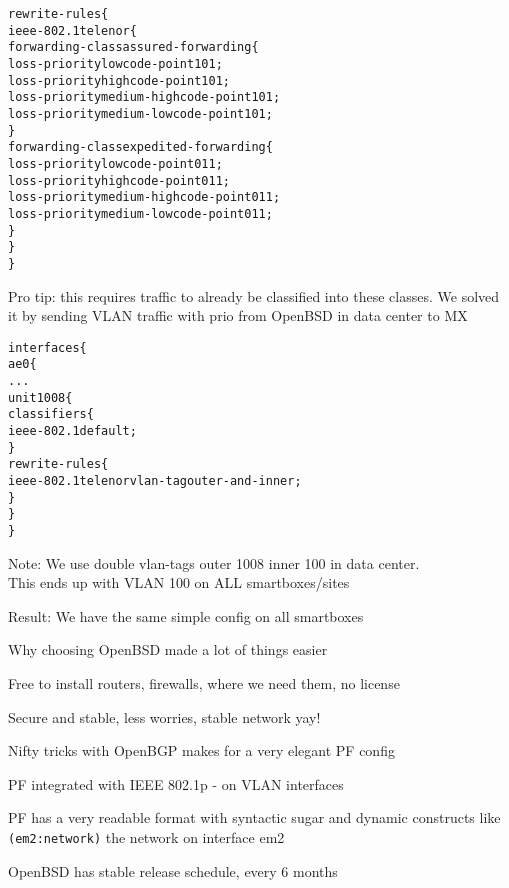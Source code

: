 \documentclass[18pt,landscape,a4paper,footrule]{foils}
\begin{document}
\begin{alltt}\small
rewrite-rules \{
    ieee-802.1 telenor \{
        forwarding-class assured-forwarding \{
            loss-priority low code-point 101;
            loss-priority high code-point 101;
            loss-priority medium-high code-point 101;
            loss-priority medium-low code-point 101;
        \}
        forwarding-class expedited-forwarding \{
            loss-priority low code-point 011;
            loss-priority high code-point 011;
            loss-priority medium-high code-point 011;
            loss-priority medium-low code-point 011;
        \}
    \}
\}
\end{alltt}

Pro tip: this requires traffic to already be classified into these classes.
We solved it by sending VLAN traffic with prio from OpenBSD in data center to MX


\begin{alltt}\small
interfaces \{
    ae0 \{
        ...
        unit 1008 \{
            classifiers \{
                ieee-802.1 default;
            \}
            rewrite-rules \{
                ieee-802.1 telenor vlan-tag outer-and-inner;
            \}
        \}
\}
\end{alltt}

Note: We use double vlan-tags outer 1008 inner 100 in data center.\\
This ends up with VLAN 100 on ALL smartboxes/sites

Result: We have the same simple config on all smartboxes


Why choosing OpenBSD made a lot of things easier

\begin{list2}
\item Free to install routers, firewalls, where we need them, no license
\item Secure and stable, less worries, stable network yay!
\item Nifty tricks with OpenBGP makes for a very elegant PF config
\item PF integrated with IEEE 802.1p - on VLAN interfaces
\item PF has a very readable format with syntactic sugar and dynamic constructs like \verb+(em2:network)+ the network on interface em2
\item OpenBSD has stable release schedule, every 6 months
\end{list2}
\end{document}
